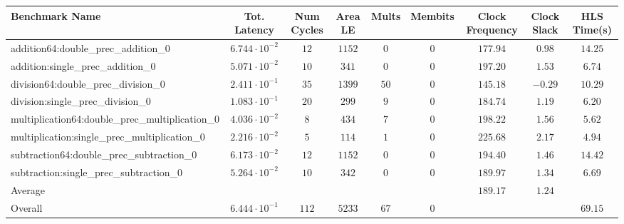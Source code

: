 \begin{tabular}{|l|c|c|c|c|c|c|c|c|}
\hline
Benchmark Name                                   & Tot. Latency            & Num Cycles & Area LE  & Mults  & Membits & Clock Frequency & Clock Slack & HLS Time(s) \\
\hline
addition64:double\_prec\_addition\_0             & $ 6.744 \cdot 10^{-2} $ & $ 12     $ & $ 1152 $ & $ 0  $ & $ 0   $ & $ 177.94      $ & $ 0.98    $ & $ 14.25   $ \\
addition:single\_prec\_addition\_0               & $ 5.071 \cdot 10^{-2} $ & $ 10     $ & $ 341  $ & $ 0  $ & $ 0   $ & $ 197.20      $ & $ 1.53    $ & $ 6.74    $ \\
division64:double\_prec\_division\_0             & $ 2.411 \cdot 10^{-1} $ & $ 35     $ & $ 1399 $ & $ 50 $ & $ 0   $ & $ 145.18      $ & $ -0.29   $ & $ 10.29   $ \\
division:single\_prec\_division\_0               & $ 1.083 \cdot 10^{-1} $ & $ 20     $ & $ 299  $ & $ 9  $ & $ 0   $ & $ 184.74      $ & $ 1.19    $ & $ 6.20    $ \\
multiplication64:double\_prec\_multiplication\_0 & $ 4.036 \cdot 10^{-2} $ & $ 8      $ & $ 434  $ & $ 7  $ & $ 0   $ & $ 198.22      $ & $ 1.56    $ & $ 5.62    $ \\
multiplication:single\_prec\_multiplication\_0   & $ 2.216 \cdot 10^{-2} $ & $ 5      $ & $ 114  $ & $ 1  $ & $ 0   $ & $ 225.68      $ & $ 2.17    $ & $ 4.94    $ \\
subtraction64:double\_prec\_subtraction\_0       & $ 6.173 \cdot 10^{-2} $ & $ 12     $ & $ 1152 $ & $ 0  $ & $ 0   $ & $ 194.40      $ & $ 1.46    $ & $ 14.42   $ \\
subtraction:single\_prec\_subtraction\_0         & $ 5.264 \cdot 10^{-2} $ & $ 10     $ & $ 342  $ & $ 0  $ & $ 0   $ & $ 189.97      $ & $ 1.34    $ & $ 6.69    $ \\
\hline
Average                                          & $                     $ & $        $ & $      $ & $    $ & $     $ & $ 189.17      $ & $ 1.24    $ & $         $ \\
\hline
Overall                                          & $ 6.444 \cdot 10^{-1} $ & $ 112    $ & $ 5233 $ & $ 67 $ & $ 0   $ & $             $ & $         $ & $ 69.15   $ \\
\hline
\end{tabular}
